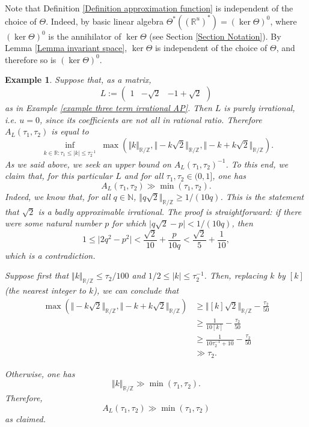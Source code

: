 \documentclass[12pt,a4paper,twoside,reqno]{amsart}
\newtheorem{Example}[Theorem]{Example}
\numberwithin{equation}{section}
\begin{document}
Note that Definition \ref{Definition approximation function} is independent of the choice of $\Theta$. Indeed, by basic linear algebra $\Theta^*((\mathbb{R}^u)^*) = (\ker \Theta)^{0} $, where $(\ker \Theta)^{0}$ is the annihilator of $\ker \Theta$ (see Section \ref{Section Notation}). By Lemma \ref{Lemma invariant space}, $\ker \Theta$ is independent of the choice of $\Theta$, and therefore so is $(\ker \Theta)^0$.\\







\begin{Example}
\label{Example approx function}
\emph{Suppose that, as a matrix, 
\begin{equation*}
L := \left(\begin{matrix} 1 & -\sqrt{2}  & -1 + \sqrt {2}\end{matrix}\right)
\end{equation*} as in Example \ref{example three term irrational AP}. Then $L$ is purely irrational, i.e. $u=0$, since its coefficients are not all in rational ratio. Therefore $A_L(\tau_1,\tau_2)$ is equal to \[ \inf\limits_{\substack{k\in \mathbb{R}: \tau_1 \leqslant \vert k\vert \leqslant \tau_2^{-1} }} \max(\Vert k\Vert_{\mathbb{R}/\mathbb{Z}},\Vert -k \sqrt{2}\Vert_{\mathbb{R}/\mathbb{Z}}, \Vert -k+k\sqrt{2}\Vert_{\mathbb{R}/\mathbb{Z}}). \] As we said above, we seek an upper bound on $A_L(\tau_1,\tau_2)^{-1}$. To this end, we claim that, for this particular $L$ and for all $\tau_1,\tau_2 \in (0,1]$, one has \[ A_L(\tau_1,\tau_2) \gg \min (\tau_1,\tau_2).\]}
\emph{Indeed, we know that, for all $q \in \mathbb{N}$, $\Vert q \sqrt{2} \Vert_{\mathbb{R}/\mathbb{Z}} \geqslant 1/(10q)$. This is the statement that $\sqrt{2}$ is a badly approximable irrational. The proof is straightforward: if there were some natural number $p$ for which $\vert q\sqrt{2} - p\vert < 1/(10q)$, then \[ 1 \leqslant \vert 2q^{2} - p^2\vert < \frac{\sqrt{2}}{10} + \frac{p}{10q} < \frac{\sqrt{2}}{5} + \frac{1}{10},\] which is a contradiction.}

\emph{Suppose first that $\Vert k\Vert_{\mathbb{R}/\mathbb{Z}}\leqslant \tau_2/100$                                                                                  and $1/2 \leqslant \vert k\vert \leqslant \tau_2^{-1}$. Then, replacing $k$ by $[k]$ (the nearest integer to $k$), we can conclude that}
\begin{align*}
\max(\Vert -k \sqrt{2}\Vert_{\mathbb{R}/\mathbb{Z}}, \Vert -k+k\sqrt{2}\Vert_{\mathbb{R}/\mathbb{Z}}) &\geqslant \Vert [k] \sqrt{2}\Vert_{\mathbb{R}/\mathbb{Z}} - \frac{\tau_2}{50} \\
& \geqslant \frac{1}{10 [k]} - \frac{\tau_2}{50}  \\
& \geqslant\frac{1}{10\tau_2^{-1} + 10} - \frac{\tau_2}{50}  \\
&\gg \tau_2.
\end{align*}

\emph{Otherwise, one has \[ \Vert k\Vert_{\mathbb{R}/\mathbb{Z}} \gg \min(\tau_1,\tau_2).\] Therefore, \[A_L(\tau_1,\tau_2) \gg \min(\tau_1, \tau_2)\] as claimed.}
\end{Example}
\end{document}
